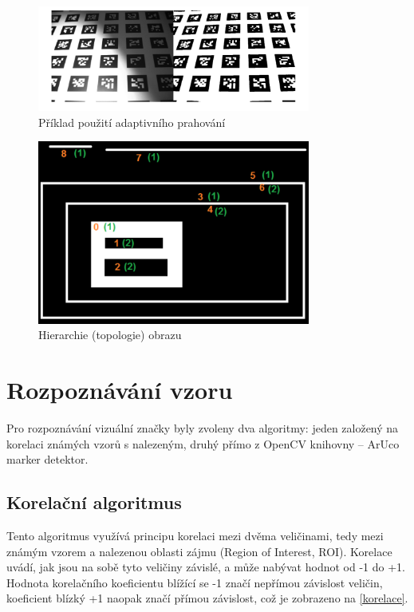 \documentclass[twoside]{ctuthesis}
\theoremstyle{plain}
\theoremstyle{definition}
\theoremstyle{note}
\begin{document}
\begin{figure}
	\caption{Příklad použití adaptivního prahování}
	
	\label{adapt}
	\includegraphics[width=0.8\textwidth]{images/2/adapt.jpg}
\end{figure}

\begin{figure}
	
	\caption{Hierarchie (topologie) obrazu}
	
	\label{hierarch}
	\includegraphics[width=0.8\textwidth]{images/2/ccomp_hierarchy.png}
\end{figure}

\section{Rozpoznávání vzoru}

Pro rozpoznávání vizuální značky byly zvoleny dva algoritmy: jeden založený na korelaci známých vzorů s nalezeným, druhý přímo z OpenCV knihovny -- ArUco marker detektor.

\subsection{Korelační algoritmus}

Tento algoritmus využívá principu korelaci mezi dvěma veličinami, tedy mezi známým vzorem a nalezenou oblasti zájmu (Region of Interest, ROI). Korelace uvádí, jak jsou na sobě tyto veličiny závislé, a může nabývat hodnot od -1 do +1. Hodnota korelačního koeficientu blížící se -1 značí nepřímou závislost veličin, koeficient blízký +1 naopak značí přímou závislost, což je zobrazeno na \ref{korelace}.
\end{document}

